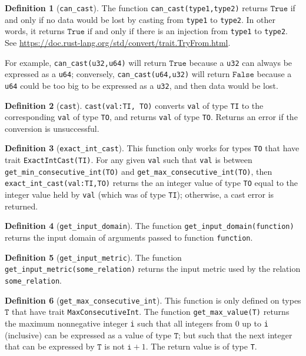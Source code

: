 \documentclass[11pt,a4paper]{article}
\theoremstyle{definition}
\newtheorem{definition}{Definition}[section]
\newcommand{\True}{\texttt{True}}
\newcommand{\False}{\texttt{False}}
\newcommand{\inRust}[2]{See \url{#2}.}
\newcommand{\T}{\texttt{T}}
\newcommand{\iffText}{\text{if and only if}}
\begin{document}
\begin{definition}[\texttt{can\_cast}]
    The function \texttt{can\_cast(type1,type2)} returns $\True$ if and only if no data would be lost by casting from \texttt{type1} to \texttt{type2}. In other words, it returns $\True$ $\iffText$ there is an injection from \texttt{type1} to \texttt{type2}. \inRust{std::convert::TryFrom}{https://doc.rust-lang.org/std/convert/trait.TryFrom.html}
\end{definition}

For example, \texttt{can\_cast(u32,u64)} will return $\True$ because a \texttt{u32} can always be expressed as a \texttt{u64}; conversely, \texttt{can\_cast(u64,u32)} will return $\False$ because a \texttt{u64} could be too big to be expressed as a \texttt{u32}, and then data would be lost.

\begin{definition}[\texttt{cast}]
    \texttt{cast(val:TI, TO)} converts \texttt{val} of type \texttt{TI} to the corresponding \texttt{val} of type \texttt{TO}, and returns \texttt{val} of type \texttt{TO}. Returns an error if the conversion is unsuccessful.
\end{definition}

\begin{definition}[\texttt{exact\_int\_cast}]
    This function only works for types \texttt{TO} that have trait \texttt{ExactIntCast(TI)}. For any given \texttt{val} such that \texttt{val} is between \texttt{get\_min\_consecutive\_int(TO)} and \texttt{get\_max\_consecutive\_int(TO)}, then \texttt{exact\_int\_cast(val:TI,TO)} returns the an integer value of type \texttt{TO} equal to the integer value held by  \texttt{val} (which was of type \texttt{TI}); otherwise, a cast error is returned.
\end{definition}

\begin{definition}[\texttt{get\_input\_domain}]
    The function \texttt{get\_input\_domain(function)} returns the input domain of arguments passed to function \texttt{function}.
\end{definition}

\begin{definition}[\texttt{get\_input\_metric}]
    The function \texttt{get\_input\_metric(some\_relation)} returns the input metric used by the relation \texttt{some\_relation}.
\end{definition}

\begin{definition}[\texttt{get\_max\_consecutive\_int}]
    This function is only defined on types $\T$ that have trait \texttt{MaxConsecutiveInt}. The function \texttt{get\_max\_value(T)} returns the maximum nonnegative integer \texttt{i} such that all integers from 0 up to \texttt{i} (inclusive) can be expressed as a value of type $\T$; but such that the next integer that can be expressed by $\T$ is not $\texttt{i}+1$. The return value is of type \texttt{T}.
\end{definition}
\end{document}
